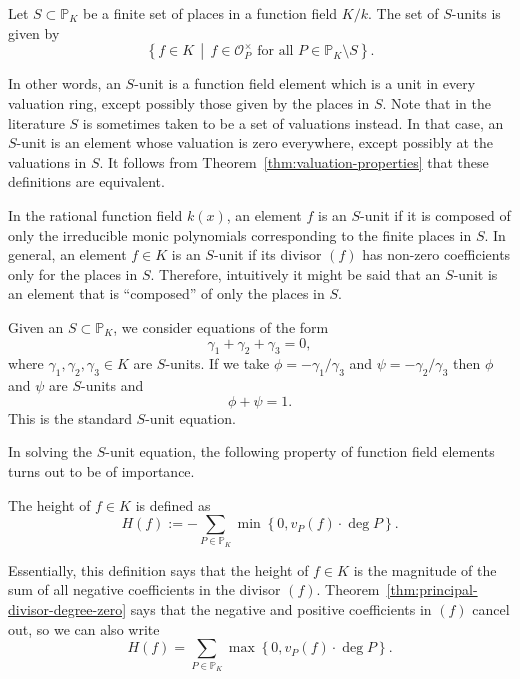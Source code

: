 \begin{definition}
  Let \(S \subset \mathbb{P}_{K}\) be a finite set of places in a function field \(K / k\). The set of \(S\)-units is given by
  \[\left\{ f \in K \,\middle|\, f \in \mathcal{O}_{P}^{\times} \text{ for all } P \in \mathbb{P}_{K} \setminus S \right\}.\]
\end{definition}

In other words, an \(S\)-unit is a function field element which is a unit in every valuation ring, except possibly those given by the places in \(S\). Note that in the literature \(S\) is sometimes taken to be a set of valuations instead. In that case, an \(S\)-unit is an element whose valuation is zero everywhere, except possibly at the valuations in \(S\). It follows from Theorem~\ref{thm:valuation-properties} that these definitions are equivalent.

In the rational function field \(k(x)\), an element \(f\) is an \(S\)-unit if it is composed of only the irreducible monic polynomials corresponding to the finite places in \(S\). In general, an element \(f \in K\) is an \(S\)-unit if its divisor \((f)\) has non-zero coefficients only for the places in \(S\). Therefore, intuitively it might be said that an \(S\)-unit is an element that is ``composed'' of only the places in \(S\).

Given an \(S \subset \mathbb{P}_{K}\), we consider equations of the form
\[\gamma_{1} + \gamma_{2} + \gamma_{3} = 0,\]
where \(\gamma_{1}, \gamma_{2}, \gamma_{3} \in K\) are \(S\)-units. If we take \(\phi = -\gamma_{1} / \gamma_{3}\) and \(\psi = -\gamma_{2} / \gamma_{3}\) then \(\phi\) and \(\psi\) are \(S\)-units and
\[\phi + \psi = 1.\]
This is the standard \(S\)-unit equation.

In solving the \(S\)-unit equation, the following property of function field elements turns out to be of importance.

\begin{definition}%
  \label{def:height}
  The height of \(f \in K\) is defined as
  \[H(f) := - \sum_{P \in \mathbb{P}_{K}} \min{\left\{ 0, v_{P}(f) \cdot \deg{P} \right\}}.\]
\end{definition}

Essentially, this definition says that the height of \(f \in K\) is the magnitude of the sum of all negative coefficients in the divisor \((f)\). Theorem~\ref{thm:principal-divisor-degree-zero} says that the negative and positive coefficients in \((f)\) cancel out, so we can also write
\[H(f) = \sum_{P \in \mathbb{P}_{K}} \max{\left\{ 0, v_{P}(f) \cdot \deg{P} \right\}}.\]


